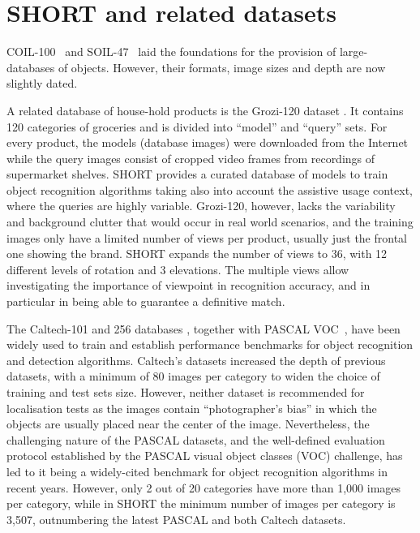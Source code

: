 \section{SHORT and related datasets} \label{sec:related-work}

COIL-100~\cite{Nene1996a} and SOIL-47~\cite{Koubaroulis2002} laid the foundations for the provision of large-databases of objects. However, their formats, image sizes and depth are now slightly dated.

A related database of house-hold products is the Grozi-120 dataset \cite{Merler2007}. It contains 120 categories of groceries and is divided into ``model'' and ``query'' sets. For every product, the models (database images) were downloaded from the Internet while the query images consist of cropped video frames from recordings of supermarket shelves. SHORT provides a curated database of models to train object recognition algorithms taking also into account the assistive usage context, where the queries are highly variable. Grozi-120, however, lacks the variability and background clutter that would occur in real world scenarios, and the training images only have a limited number of views per product, usually just the frontal one showing the brand. SHORT expands the number of views to 36, with 12 different levels of rotation and 3 elevations.  The multiple views allow investigating the importance of viewpoint in recognition accuracy, and in particular in being able to guarantee a definitive match. 

The Caltech-101 and 256 databases \cite{Feifei2007,Griffin2007}, together with PASCAL VOC~\cite{everingham2010pascal}, have been widely used to train and establish performance benchmarks for object recognition and detection algorithms. Caltech's datasets increased the depth of previous datasets, with a minimum of 80 images per category to widen the choice of training and test sets size. However, neither dataset is recommended for localisation tests as the images contain ``photographer's bias'' in which the objects are usually placed near the center of the image. Nevertheless, the challenging nature of the PASCAL datasets, and the well-defined evaluation protocol established by the PASCAL visual object classes (VOC) challenge, has led to it being a widely-cited benchmark for object recognition algorithms in recent years. However, only 2 out of 20 categories have more than 1,000 images per category, while in SHORT the minimum number of images per category is 3,507, outnumbering the latest PASCAL and both Caltech datasets.
 
